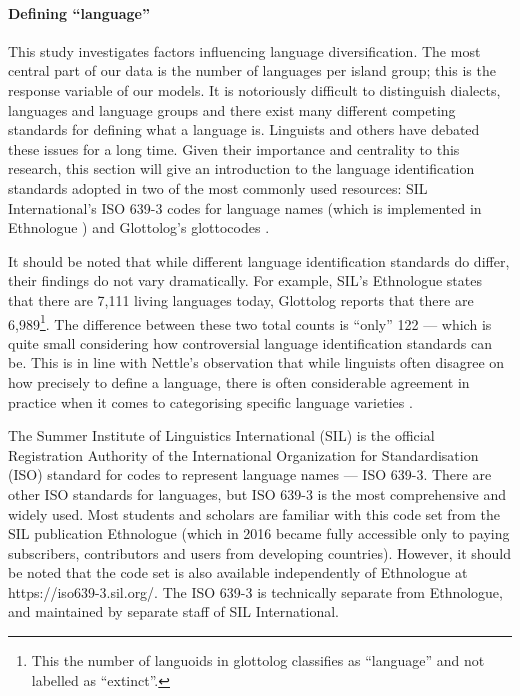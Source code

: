 \documentclass[unnumsec,webpdf,modern,medium]{oup-authoring-template}
\begin{document}
\paragraph{Defining ``language''}
\label{appendix_sec:language_class}
This study investigates factors influencing language diversification. The most central part of our data is the number of languages per island group; this is the response variable of our models. It is notoriously difficult to distinguish dialects, languages and language groups and there exist many different competing standards for defining what a language is. Linguists and others have debated these issues for a long time. Given their importance and centrality to this research, this section will give an introduction to the language identification standards adopted in two of the most commonly used resources: SIL International's ISO 639-3 codes for language names (which is implemented in Ethnologue \citep{ethnologue22}) and Glottolog's glottocodes \citet{glottolog3}.

It should be noted that while different language identification standards do differ, their findings do not vary dramatically. For example, SIL's Ethnologue states that there are 7,111 living languages today, Glottolog reports that there are 6,989\footnote{This the number of languoids in glottolog classifies as ``language'' and not labelled as ``extinct''.}. The difference between these two total counts is ``only'' 122 --- which is quite small considering how controversial language identification standards can be. This is in line with Nettle's observation that while linguists often disagree on how precisely to define a language, there is often considerable agreement in practice when it comes to categorising specific language varieties \citep[356]{NETTLE1998}.

The Summer Institute of Linguistics International (SIL) is the official Registration Authority of the International Organization for Standardisation (ISO) standard for codes to represent language names --- ISO 639-3. There are other ISO standards for languages, but ISO 639-3 is the most comprehensive and widely used. Most students and scholars are familiar with this code set from the SIL publication Ethnologue (which in 2016 became fully accessible only to paying subscribers, contributors and users from developing countries). However, it should be noted that the code set is also available independently of Ethnologue at https://iso639-3.sil.org/. The ISO 639-3 is technically separate from Ethnologue, and maintained by separate staff of SIL International.
\end{document}
